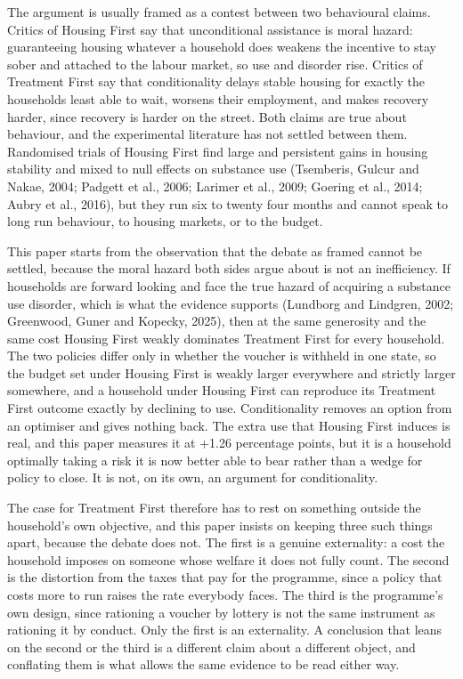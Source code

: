 \documentclass[10pt]{article}
\begin{document}
The argument is usually framed as a contest between two behavioural claims.
Critics of Housing First say that unconditional assistance is moral hazard:
guaranteeing housing whatever a household does weakens the incentive to stay
sober and attached to the labour market, so use and disorder rise. Critics of
Treatment First say that conditionality delays stable housing for exactly the
households least able to wait, worsens their employment, and makes recovery
harder, since recovery is harder on the street. Both claims are true about
behaviour, and the experimental literature has not settled between them.
Randomised trials of Housing First find large and persistent gains in housing
stability and mixed to null effects on substance use (Tsemberis, Gulcur and
Nakae, 2004; Padgett et al., 2006; Larimer et al., 2009; Goering
et al., 2014; Aubry et al., 2016), but they run six to twenty four months and
cannot speak to long run behaviour, to housing markets, or to the budget.



This paper starts from the observation that the debate as framed cannot be
settled, because the moral hazard both sides argue about is not an inefficiency.
If households are forward looking and face the true hazard of acquiring a
substance use disorder, which is what the evidence supports (Lundborg and
Lindgren, 2002; Greenwood, Guner and Kopecky, 2025), then at the same generosity
and the same cost Housing First weakly dominates Treatment First for every
household. The two policies differ only in whether the voucher is withheld in one
state, so the budget set under Housing First is weakly larger everywhere and
strictly larger somewhere, and a household under Housing First can reproduce its
Treatment First outcome exactly by declining to use. Conditionality removes an
option from an optimiser and gives nothing back. The extra use that Housing First
induces is real, and this paper measures it at +1.26 percentage points, but it is
a household optimally taking a risk it is now better able to bear rather than a
wedge for policy to close. It is not, on its own, an argument for conditionality.



The case for Treatment First therefore has to rest on something outside the
household's own objective, and this paper insists on keeping three such things
apart, because the debate does not. The first is a genuine externality: a cost
the household imposes on someone whose welfare it does not fully count. The
second is the distortion from the taxes that pay for the programme, since a
policy that costs more to run raises the rate everybody faces. The third is the
programme's own design, since rationing a voucher by lottery is not the same
instrument as rationing it by conduct. Only the first is an externality. A
conclusion that leans on the second or the third is a different claim about a
different object, and conflating them is what allows the same evidence to be read
either way.
\end{document}
